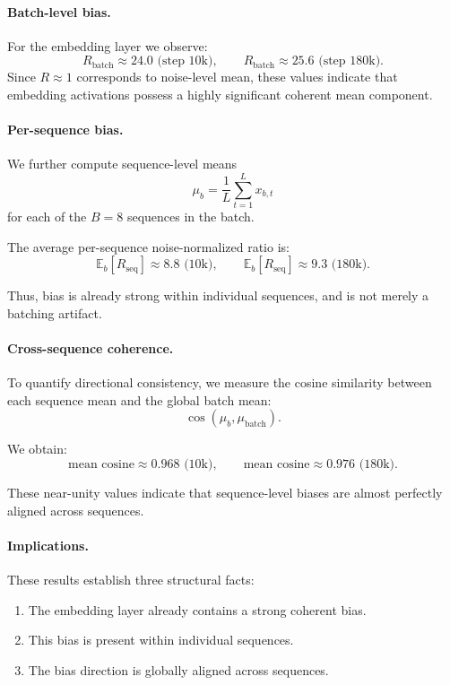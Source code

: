 \paragraph{Batch-level bias.}
For the embedding layer we observe:
\[
R_{\text{batch}} \approx 24.0 \text{ (step 10k)},
\qquad
R_{\text{batch}} \approx 25.6 \text{ (step 180k)}.
\]
Since $R\approx 1$ corresponds to noise-level mean,
these values indicate that embedding activations possess a
highly significant coherent mean component.

\paragraph{Per-sequence bias.}
We further compute sequence-level means
\[
\mu_b = \frac{1}{L} \sum_{t=1}^L x_{b,t}
\]
for each of the $B=8$ sequences in the batch.

The average per-sequence noise-normalized ratio is:
\[
\mathbb{E}_b[R_{\text{seq}}] \approx 8.8 \text{ (10k)},
\qquad
\mathbb{E}_b[R_{\text{seq}}] \approx 9.3 \text{ (180k)}.
\]

Thus, bias is already strong within individual sequences,
and is not merely a batching artifact.

\paragraph{Cross-sequence coherence.}
To quantify directional consistency, we measure the cosine
similarity between each sequence mean and the global batch mean:
\[
\cos(\mu_b, \mu_{\text{batch}}).
\]

We obtain:
\[
\text{mean cosine} \approx 0.968 \text{ (10k)},
\qquad
\text{mean cosine} \approx 0.976 \text{ (180k)}.
\]

These near-unity values indicate that sequence-level biases
are almost perfectly aligned across sequences.

\paragraph{Implications.}
These results establish three structural facts:

\begin{enumerate}
\item The embedding layer already contains a strong coherent bias.
\item This bias is present within individual sequences.
\item The bias direction is globally aligned across sequences.
\end{enumerate}


